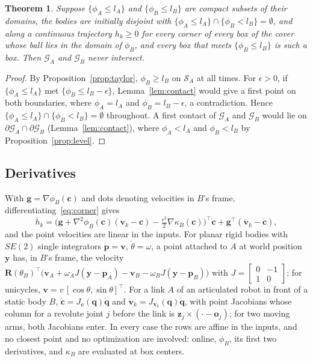 \documentclass[journal]{IEEEtran}
\newtheorem{theorem}{Theorem}
\theoremstyle{definition}
\newcommand{\Rot}{\mathbf{R}}
\begin{document}
\begin{theorem}\label{thm:cover}
Suppose $\{\phi_A\le l_A\}$ and $\{\phi_B\le l_B\}$ are compact subsets of their domains, the
bodies are initially disjoint with $\{\phi_A\le l_A\}\cap\{\phi_B<l_B\}=\emptyset$, and along a
continuous trajectory $h_k\ge0$ for every corner of every box of the cover whose ball lies in the
domain of $\phi_B$, and every box that meets $\{\phi_B\le l_B\}$ is such a box. Then $\mathcal G_A$
and $\mathcal G_B$ never intersect.
\end{theorem}
\begin{proof}
By Proposition~\ref{prop:taylor}, $\phi_B\ge l_B$ on $\mathcal S_A$ at all times. For $\epsilon>0$,
if $\{\phi_A\le l_A\}$ met $\{\phi_B\le l_B-\epsilon\}$, Lemma~\ref{lem:contact} would give a first
point on both boundaries, where $\phi_A=l_A$ and $\phi_B=l_B-\epsilon$, a contradiction. Hence
$\{\phi_A\le l_A\}\cap\{\phi_B<l_B\}=\emptyset$ throughout. A first contact of $\mathcal G_A$ and
$\mathcal G_B$ would lie on $\partial\mathcal G_A\cap\partial\mathcal G_B$
(Lemma~\ref{lem:contact}), where $\phi_A<l_A$ and $\phi_B<l_B$ by Proposition~\ref{prop:level}.
\end{proof}

\subsection{Derivatives}
With $\mathbf g=\nabla\phi_B(\mathbf c)$ and dots denoting velocities in $B$'s frame,
differentiating~\eqref{eq:corner} gives
\begin{equation}\label{eq:hdot-cover}
\dot h_k=\big(\mathbf g+\nabla^2\phi_B(\mathbf c)(\mathbf v_k-\mathbf c)
-\tfrac{r^2}{2}\nabla\kappa_B(\mathbf c)\big)^{\!\top}\dot{\mathbf c}
+\mathbf g^\top(\dot{\mathbf v}_k-\dot{\mathbf c}),
\end{equation}
and the point velocities are linear in the inputs. For planar rigid bodies with $SE(2)$ single
integrators $\dot{\mathbf p}=\mathbf v$, $\dot\theta=\omega$, a point attached to $A$ at world position
$\mathbf y$ has, in $B$'s frame, the velocity
$\Rot(\theta_B)^{\!\top}\big(\mathbf v_A+\omega_AJ(\mathbf y-\mathbf p_A)-\mathbf v_B-\omega_BJ(\mathbf y-\mathbf p_B)\big)$
with $J=\left[\begin{smallmatrix}0&-1\\1&0\end{smallmatrix}\right]$; for unicycles,
$\mathbf v=v\,[\cos\theta,\sin\theta]^\top$. For a link $A$ of an articulated robot in front of a
static body $B$, $\dot{\mathbf c}=J_{\mathbf c}(\mathbf q)\dot{\mathbf q}$ and
$\dot{\mathbf v}_k=J_{\mathbf v_k}(\mathbf q)\dot{\mathbf q}$, with point Jacobians whose column for
a revolute joint $j$ before the link is $\mathbf z_j\times(\cdot-\mathbf o_j)$; for two moving arms,
both Jacobians enter. In every case the rows are affine in the inputs, and no closest point and no
optimization are involved: online, $\phi_B$, its first two derivatives, and $\kappa_B$ are evaluated
at box centers.
\end{document}
